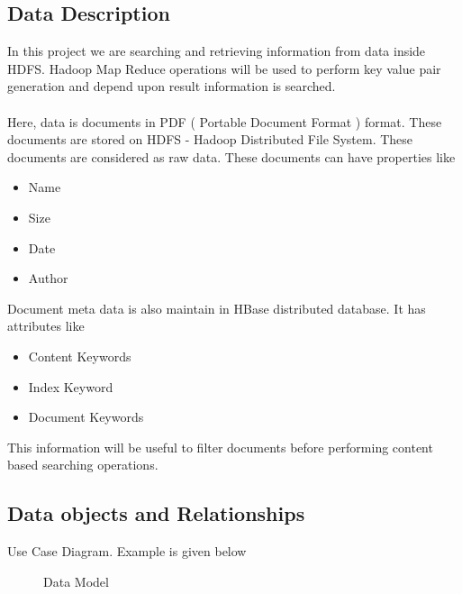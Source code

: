 \documentclass[oneside,a4paper,12pt]{report}
\begin{document}
\subsection{Data Description}  
In this project we are searching and retrieving information from data inside HDFS. Hadoop Map Reduce operations will be used to perform key value pair generation and depend upon result information is searched. \\ \\
Here, data is documents in PDF ( Portable Document Format ) format. These documents are stored on HDFS - Hadoop Distributed File System. These documents are considered as raw data. These documents can have properties like 
\begin{itemize}
\item Name
\item Size
\item Date
\item Author 
\end{itemize}
Document meta data is also maintain in HBase distributed database. It has attributes like
\begin{itemize}
\item Content Keywords
\item Index Keyword
\item Document Keywords
\end{itemize}
This information will be useful to filter documents before performing content based  searching operations.


\subsection{Data objects and Relationships}
Use Case Diagram. Example is given below
\begin{center}
	\begin{figure}[H]
		\centering
	  \caption{Data Model}
	  \label{fig:usecase}
	\end{figure}
\end{center}  
 
\end{document}
